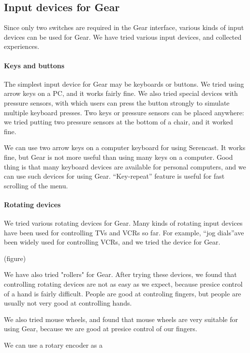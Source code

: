 \documentclass{article}
\def\SC{\textsf{\small Serencast}}
\begin{document}
\subsection{Input devices for Gear}

Since only two switches are required in the Gear interface,
various kinds of input devices can be used for Gear.
We have tried various input devices, and collected experiences.

\paragraph{Keys and buttons}

The simplest input device for Gear may be keyboards or buttons.
We tried using arrow keys on a PC, and it works fairly fine.
We also tried special devices with pressure sensors, with which users can press the button strongly to simulate multiple keyboard presses.
Two keys or pressure sensors can be placed anywhere: we tried putting two pressure sensors at the bottom of a chair, and it worked fine.

We can use two arrow keys on a computer keyboard for using {\SC}.
It works fine, but Gear is not more useful than using many keys on a computer.
%
Good thing is that many keyboard devices are available for personal computers,
and we can use such devices for using Gear.
``Key-repeat'' feature is useful for fast scrolling of the menu.

\paragraph{Rotating devices}

We tried various rotating devices for Gear.
Many kinds of rotating input devices have been used for controlling TVs and VCRs so far.
For example, ``jog dials''ave been widely used for controlling VCRs, and we tried the device for Gear.

(figure)

We have also tried "rollers" for Gear.
After trying these devices, we found that controlling rotating devices are not as easy as we expect,
because presice control of a hand is fairly difficult.
People are good at controling fingers, but people are usually not very good at controlling hands.

We also tried mouse wheels, and found that mouse wheels are very suitable for using Gear, because
we are good at presice control of our fingers.


We can use a rotary encoder as a 
\end{document}
